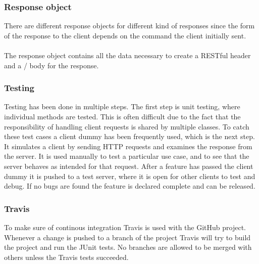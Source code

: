 \subsubsection{Response object}
There are different response objects for different kind of responses since the form of the response to the client depends on the command the client initially sent.\\
\\
The response object contains all the data necessary to create a RESTful header and a \json/ 
body for the response.
\subsubsection{Testing}
Testing has been done in multiple steps. The first step is unit testing, where individual methods are tested. This is often difficult due to the fact that the responsibility of handling client requests is shared by multiple classes. To catch these test cases a client dummy has been frequently used, which is the next step. 
It simulates a client by sending HTTP requests and examines the response from the server. It is used
manually to test a particular use case, and to see that the server behaves as intended for that request.
After a feature has passed the client dummy it is pushed to a test server, where it is open for other clients to test and debug.
If no bugs are found the feature is declared complete and can be released.
\subsubsection{Travis}
To make sure of continous integration Travis is used with the GitHub project. Whenever a change is pushed to a branch of the project Travis will try to build the project and run the JUnit tests. No branches are allowed to be merged with others unless the Travis tests succeeded. 